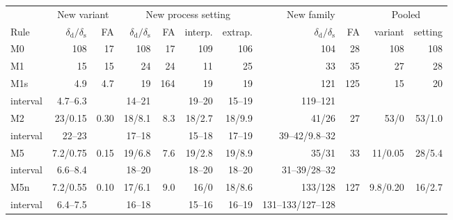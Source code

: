\documentclass[pdflatex,sn-basic,lineno]{sn-jnl}
\providecommand{\DIFaddbeginFL}{} %
\providecommand{\DIFdelendFL}{} %
\newcommand{\DIFaddincludegraphics}[2][]{{\color{blue}\fbox{\DIFOincludegraphics[#1]{#2}}}} %
\DeclareRobustCommand{\DIFaddbeginFL}{\DIFOaddbeginFL \let\includegraphics\DIFaddincludegraphics} %
\DeclareRobustCommand{\DIFdelendFL}{\DIFOaddendFL \let\includegraphics\DIFOincludegraphics} %
\begin{document}
\begin{table}[t]
\DIFdelendFL \DIFaddbeginFL \begin{tabular}{@{}lrrrrrrrrrr@{}}
\toprule
 & \multicolumn{2}{c}{New variant} & \multicolumn{4}{c}{New process setting} & \multicolumn{2}{c}{New family} & \multicolumn{2}{c}{Pooled} \\
\cmidrule(lr){2-3}\cmidrule(lr){4-7}\cmidrule(lr){8-9}\cmidrule(lr){10-11}
Rule & $\delta_\mathrm{d}/\delta_\mathrm{s}$ & FA & $\delta_\mathrm{d}/\delta_\mathrm{s}$ & FA & interp. & extrap. & $\delta_\mathrm{d}/\delta_\mathrm{s}$ & FA & variant & setting \\
\midrule
M0 & 108 & 17 & 108 & 17 & 109 & 106 & 104 & 28 & 108 & 108 \\
M1 & 15 & 15 & 24 & 24 & 11 & 25 & 33 & 35 & 27 & 28 \\
M1s & 4.9 & 4.7 & 19 & 164 & 19 & 19 & 121 & 125 & 15 & 20 \\
\quad interval & 4.7--6.3 &  & 14--21 &  & 19--20 & 15--19 & 119--121 &  &  & \\
M2 & 23/0.15 & 0.30 & 18/8.1 & 8.3 & 18/2.7 & 18/9.9 & 41/26 & 27 & 53/0 & 53/1.0 \\
\quad interval & 22--23 &  & 17--18 &  & 15--18 & 17--19 & 39--42/9.8--32 &  &  & \\
M5 & 7.2/0.75 & 0.15 & 19/6.8 & 7.6 & 19/2.8 & 19/8.9 & 35/31 & 33 & 11/0.05 & 28/5.4 \\
\quad interval & 6.6--8.4 &  & 18--20 &  & 18--20 & 18--20 & 31--39/28--32 &  &  & \\
M5n & 7.2/0.55 & 0.10 & 17/6.1 & 9.0 & 16/0 & 18/8.6 & 133/128 & 127 & 9.8/0.20 & 16/2.7 \\
\quad interval & 6.4--7.5 &  & 16--18 &  & 15--16 & 16--19 & 131--133/127--128 &  &  & \\

\end{tabular}
\end{table}
\end{document}
